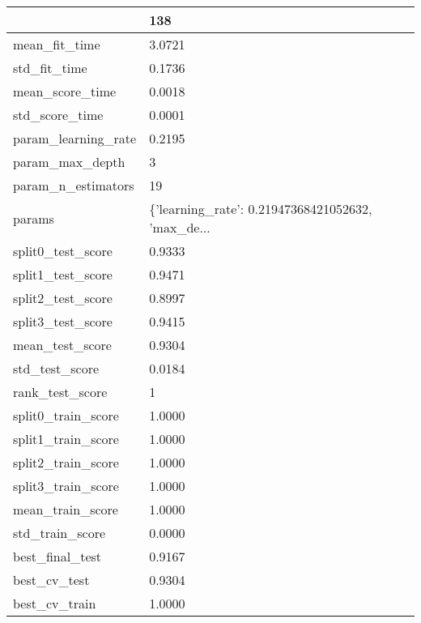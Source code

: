 \begin{tabular}{ll}
\toprule
{} &                                                138 \\
\midrule
mean\_fit\_time       &                                             3.0721 \\
std\_fit\_time        &                                             0.1736 \\
mean\_score\_time     &                                             0.0018 \\
std\_score\_time      &                                             0.0001 \\
param\_learning\_rate &                                             0.2195 \\
param\_max\_depth     &                                                  3 \\
param\_n\_estimators  &                                                 19 \\
params              &  \{'learning\_rate': 0.21947368421052632, 'max\_de... \\
split0\_test\_score   &                                             0.9333 \\
split1\_test\_score   &                                             0.9471 \\
split2\_test\_score   &                                             0.8997 \\
split3\_test\_score   &                                             0.9415 \\
mean\_test\_score     &                                             0.9304 \\
std\_test\_score      &                                             0.0184 \\
rank\_test\_score     &                                                  1 \\
split0\_train\_score  &                                             1.0000 \\
split1\_train\_score  &                                             1.0000 \\
split2\_train\_score  &                                             1.0000 \\
split3\_train\_score  &                                             1.0000 \\
mean\_train\_score    &                                             1.0000 \\
std\_train\_score     &                                             0.0000 \\
best\_final\_test     &                                             0.9167 \\
best\_cv\_test        &                                             0.9304 \\
best\_cv\_train       &                                             1.0000 \\
\bottomrule
\end{tabular}
